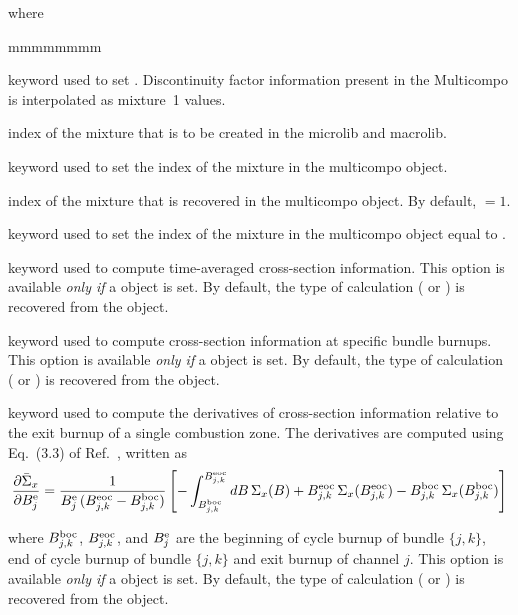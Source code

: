 \noindent where
\begin{ListeDeDescription}{mmmmmmmm}

\item[\moc{MIX}] keyword used to set . Discontinuity factor information present in the Multicompo is interpolated as mixture~1 values.

\item[\dusa{imix}] index of the mixture that is to be created in the {\sc microlib} and {\sc macrolib}.

\item[\moc{FROM}] keyword used to set the index of the mixture in the {\sc multicompo} object.

\item[\dusa{imixold}] index of the mixture that is recovered in the {\sc multicompo} object. By default, $=1$.

\item[\moc{USE}] keyword used to set the index of the mixture in the {\sc multicompo} object equal to .

\item[\moc{TIMAV-BURN}] keyword used to compute time-averaged cross-section information. This option is available {\sl only if} a  object is set.
By default, the type of calculation ( or ) is recovered from the  object.

\item[\moc{INST-BURN}] keyword used to compute cross-section information at specific bundle burnups. This option is available {\sl only if} a  object is set.
By default, the type of calculation ( or ) is recovered from the  object.

\item[\moc{AVG-EX-BURN}] keyword used to compute the derivatives of cross-section information relative to the exit burnup of a single combustion zone. The derivatives are computed using Eq.~(3.3) of Ref.~, written as
$$
{\partial \bar\Sigma_x\over \partial B_j^{\rm e}}={1\over B_j^{\rm e}\, (B_{j,k}^{\rm eoc}-B_{j,k}^{\rm boc})}
\left[- \int_{B_{j,k}^{\rm boc}}^{B_{j,k}^{\rm eoc}}dB \, \Sigma_x(B)+B_{j,k}^{\rm eoc}\, \Sigma_x(B_{j,k}^{\rm eoc})-B_{j,k}^{\rm boc}\, \Sigma_x(B_{j,k}^{\rm boc})\right]
$$

\noindent where $B_{j,k}^{\rm boc}$, $B_{j,k}^{\rm eoc}$, and $B_j^{\rm e}$ are the beginning of cycle burnup of bundle $\{j,k\}$, end of cycle burnup of bundle $\{j,k\}$ and exit burnup of channel $j$. This option is available {\sl only if} a  object is set.
By default, the type of calculation ( or ) is recovered from the  object.


\end{ListeDeDescription}
